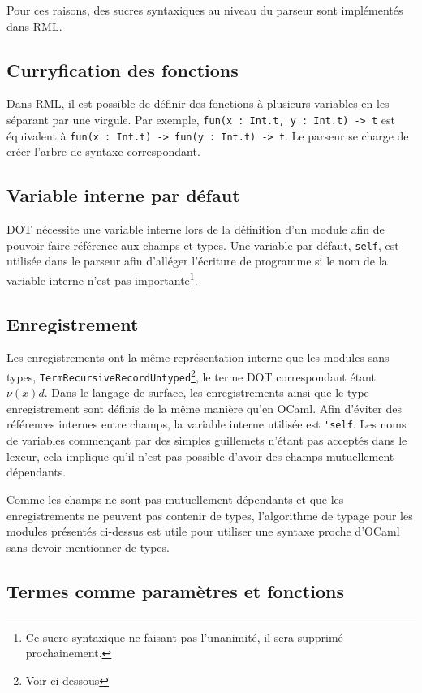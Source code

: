 Pour ces raisons, des sucres syntaxiques au niveau du parseur sont implémentés
dans RML.

\subsection*{Curryfication des fonctions}

Dans RML, il est possible de définir des fonctions à plusieurs variables en les
séparant par une virgule.
Par exemple, \verb|fun(x : Int.t, y : Int.t) -> t| est équivalent à
\verb|fun(x : Int.t) -> fun(y : Int.t) -> t|. Le parseur se charge de créer l'arbre de
syntaxe correspondant.

\subsection*{Variable interne par défaut}

DOT nécessite une variable interne lors de la définition d'un module afin de
pouvoir faire référence aux champs et types. Une variable par défaut,
\verb|self|, est utilisée dans le parseur afin d'alléger l'écriture de programme
si le nom de la variable interne n'est pas importante\footnote{Ce sucre
  syntaxique ne faisant pas l'unanimité, il sera supprimé prochainement.}.

\subsection*{Enregistrement}

Les enregistrements ont la même représentation interne que les modules sans types,
\verb|TermRecursiveRecordUntyped|\footnote{Voir ci-dessous}, le terme DOT
correspondant étant $\nu(x) d$. Dans le langage de surface, les enregistrements
ainsi que le type enregistrement
sont définis de la même manière qu'en OCaml. Afin d'éviter des références
internes entre champs, la variable interne utilisée est \verb|'self|. Les noms
de variables commençant par des simples guillemets n'étant pas acceptés dans le
lexeur, cela implique qu'il n'est pas possible d'avoir des champs mutuellement
dépendants.

Comme les champs ne sont pas mutuellement dépendants et que les enregistrements
ne peuvent pas contenir de types, l'algorithme de typage pour les modules
présentés ci-dessus est utile pour utiliser une syntaxe proche d'OCaml sans
devoir mentionner de types.

\subsection*{Termes comme paramètres et fonctions}

